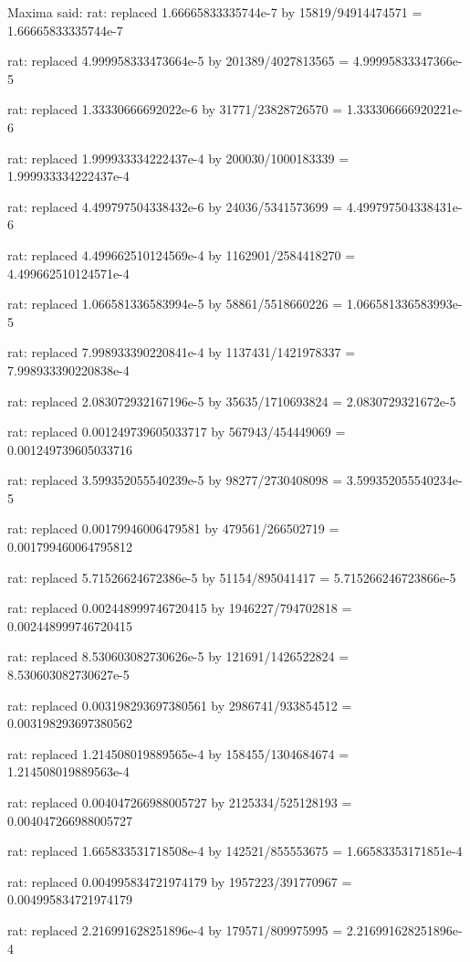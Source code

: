 \documentclass[a4paper,10pt]{article}
\begin{document}
\begin{eulernotebook}
\begin{eulercomment}
\begin{eulercomment}
\begin{eulercomment}
\begin{eulercomment}
\begin{eulercomment}
\begin{eulercomment}
\begin{eulercomment}
\begin{eulercomment}
\begin{eulercomment}
\begin{eulercomment}
\begin{eulercomment}
\begin{eulercomment}
\begin{eulercomment}
\begin{eulercomment}
\begin{eulercomment}
\begin{eulercomment}
\begin{euleroutput}
  Maxima said:
  rat: replaced 1.66665833335744e-7 by 15819/94914474571 = 1.66665833335744e-7
  
  rat: replaced 4.999958333473664e-5 by 201389/4027813565 = 4.99995833347366e-5
  
  rat: replaced 1.33330666692022e-6 by 31771/23828726570 = 1.333306666920221e-6
  
  rat: replaced 1.999933334222437e-4 by 200030/1000183339 = 1.999933334222437e-4
  
  rat: replaced 4.499797504338432e-6 by 24036/5341573699 = 4.499797504338431e-6
  
  rat: replaced 4.499662510124569e-4 by 1162901/2584418270 = 4.499662510124571e-4
  
  rat: replaced 1.066581336583994e-5 by 58861/5518660226 = 1.066581336583993e-5
  
  rat: replaced 7.998933390220841e-4 by 1137431/1421978337 = 7.998933390220838e-4
  
  rat: replaced 2.083072932167196e-5 by 35635/1710693824 = 2.0830729321672e-5
  
  rat: replaced 0.001249739605033717 by 567943/454449069 = 0.001249739605033716
  
  rat: replaced 3.599352055540239e-5 by 98277/2730408098 = 3.599352055540234e-5
  
  rat: replaced 0.00179946006479581 by 479561/266502719 = 0.001799460064795812
  
  rat: replaced 5.71526624672386e-5 by 51154/895041417 = 5.715266246723866e-5
  
  rat: replaced 0.002448999746720415 by 1946227/794702818 = 0.002448999746720415
  
  rat: replaced 8.530603082730626e-5 by 121691/1426522824 = 8.530603082730627e-5
  
  rat: replaced 0.003198293697380561 by 2986741/933854512 = 0.003198293697380562
  
  rat: replaced 1.214508019889565e-4 by 158455/1304684674 = 1.214508019889563e-4
  
  rat: replaced 0.004047266988005727 by 2125334/525128193 = 0.004047266988005727
  
  rat: replaced 1.665833531718508e-4 by 142521/855553675 = 1.66583353171851e-4
  
  rat: replaced 0.004995834721974179 by 1957223/391770967 = 0.004995834721974179
  
  rat: replaced 2.216991628251896e-4 by 179571/809975995 = 2.216991628251896e-4
  

\end{euleroutput}
\end{eulercomment}
\end{eulercomment}
\end{eulercomment}
\end{eulercomment}
\end{eulercomment}
\end{eulercomment}
\end{eulercomment}
\end{eulercomment}
\end{eulercomment}
\end{eulercomment}
\end{eulercomment}
\end{eulercomment}
\end{eulercomment}
\end{eulercomment}
\end{eulercomment}
\end{eulercomment}
\end{eulernotebook}
\end{document}
